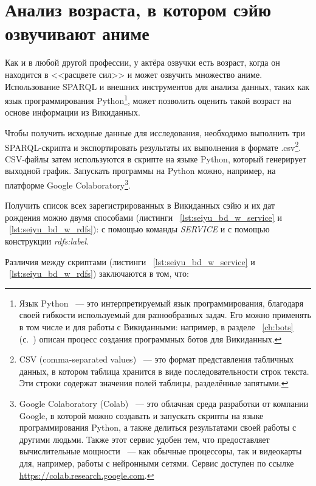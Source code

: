 \section{Анализ возраста, в котором сэйю озвучивают аниме}

Как и в любой другой профессии, у актёра озвучки есть возраст, когда он находится в <<расцвете сил>> и может озвучить множество аниме. Использование SPARQL и внешних инструментов для анализа данных, таких как язык программирования Python\footnote{Язык Python ~--- это интерпретируемый язык программирования, благодаря своей гибкости используемый для разнообразных задач. Его можно применять в том числе и для работы с Викиданными: например, в разделе ~\ref{ch:bots} (с.~\pageref{ch:bots}) описан процесс создания программных ботов для Викиданных.}, может позволить оценить такой возраст на основе информации из Викиданных.

Чтобы получить исходные данные для исследования, необходимо выполнить три SPARQL-скрипта и экспортировать результаты их выполнения в формате .csv\footnote{CSV (comma-separated values) ~--- это формат представления табличных данных, в котором таблица хранится в виде последовательности строк текста. Эти строки содержат значения полей таблицы, разделённые запятыми.}. CSV-файлы затем используются в скрипте на языке Python, который генерирует выходной график. Запускать программы на Python можно, например, на платформе Google Colaboratory\footnote{Google Colaboratory (Colab) ~--- это облачная среда разработки от компании Google, в которой можно создавать и запускать скрипты на языке программирования Python, а также делиться результатами своей работы с другими людьми. Также этот сервис удобен тем, что предоставляет вычислительные мощности ~--- как обычные процессоры, так и видеокарты для, например, работы с нейронными сетями. Сервис доступен по ссылке \href{https://colab.research.google.com}{https://colab.research.google.com}.}.

Получить список всех зарегистрированных в Викиданных сэйю и их дат рождения можно двумя способами (листинги  ~\protect\ref{lst:seiyu_bd_w_service} и  ~\protect\ref{lst:seiyu_bd_w_rdfs}): с помощью команды \emph{SERVICE} и с помощью конструкции \emph{rdfs:label}.

Различия между скриптами (листинги  ~\protect\ref{lst:seiyu_bd_w_service} и  ~\protect\ref{lst:seiyu_bd_w_rdfs}) заключаются в том, что:

